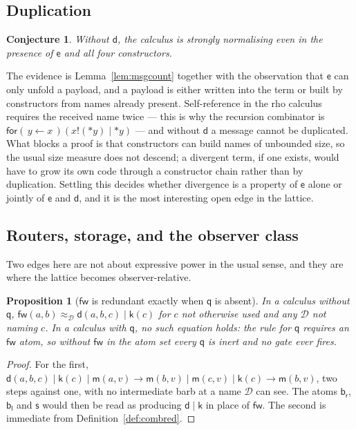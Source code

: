 \documentclass[11pt]{article}
\theoremstyle{plain}
\newtheorem{proposition}[theorem]{Proposition}
\newtheorem{conjecture}[theorem]{Conjecture}
\theoremstyle{definition}
\theoremstyle{remark}
\newcommand{\drp}[1]{{*}#1}
\newcommand{\inp}[3]{\mathsf{for}(\,#1 \leftarrow #2\,)#3}
\newcommand{\out}[2]{#1!(#2)}
\newcommand{\Obs}{\mathcal{D}}
\newcommand{\bisim}{\approx}
\newcommand{\mm}{\mathsf{m}}
\newcommand{\dd}{\mathsf{d}}
\newcommand{\kk}{\mathsf{k}}
\newcommand{\fw}{\mathsf{fw}}
\newcommand{\bl}{\mathsf{b}_{\mathsf{l}}}
\newcommand{\br}{\mathsf{b}_{\mathsf{r}}}
\newcommand{\sy}{\mathsf{s}}
\newcommand{\ev}{\mathsf{e}}
\newcommand{\qq}{\mathsf{q}}
\newcommand{\red}{\longrightarrow}
\begin{document}
\subsection{Duplication}

\begin{conjecture}
\label{conj:dup}
Without $\dd$, the calculus is strongly normalising even in the presence of
$\ev$ and all four constructors.
\end{conjecture}

The evidence is Lemma~\ref{lem:msgcount} together with the observation that
$\ev$ can only unfold a payload, and a payload is either written into the
term or built by constructors from names already present. Self-reference in
the rho calculus requires the received name twice --- this is why the
recursion combinator is $\inp{y}{x}{(\out{x}{\drp{y}} \mid \drp{y})}$ --- and
without $\dd$ a message cannot be duplicated. What blocks a proof is that
constructors can build names of unbounded size, so the usual size measure
does not descend; a divergent term, if one exists, would have to grow its own
code through a constructor chain rather than by duplication. Settling this
decides whether divergence is a property of $\ev$ alone or jointly of $\ev$
and $\dd$, and it is the most interesting open edge in the lattice.

\subsection{Routers, storage, and the observer class}

Two edges here are not about expressive power in the usual sense, and they
are where the lattice becomes observer-relative.

\begin{proposition}[$\fw$ is redundant exactly when $\qq$ is absent]
\label{prop:fwq}
In a calculus without $\qq$, $\fw(a,b) \bisim_{\Obs} \dd(a,b,c) \mid \kk(c)$
for $c$ not otherwise used and any $\Obs$ not naming $c$. In a calculus with
$\qq$, no such equation holds: the rule for $\qq$ requires an $\fw$ atom, so
without $\fw$ in the atom set every $\qq$ is inert and no gate ever fires.
\end{proposition}

\begin{proof}
For the first, $\dd(a,b,c) \mid \kk(c) \mid \mm(a,v) \red \mm(b,v) \mid
\mm(c,v) \mid \kk(c) \red \mm(b,v)$, two steps against one, with no
intermediate barb at a name $\Obs$ can see. The atoms $\br$, $\bl$ and $\sy$
would then be read as producing $\dd \mid \kk$ in place of $\fw$. The second
is immediate from Definition~\ref{def:combred}.
\end{proof}
\end{document}
